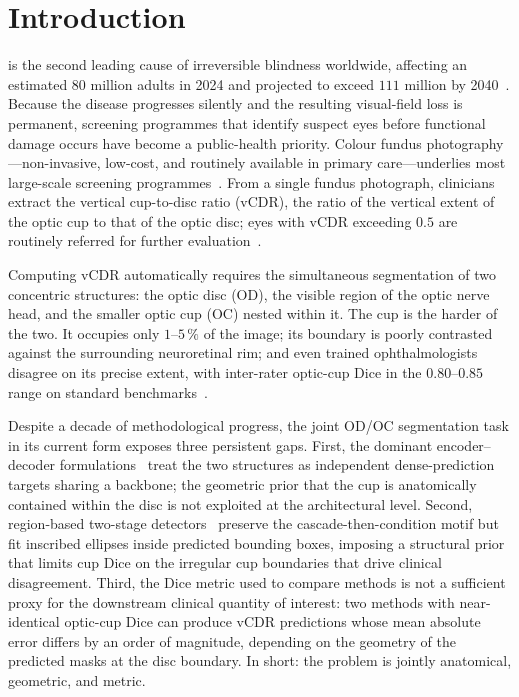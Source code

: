 \documentclass[10pt,journal,twocolumn]{IEEEtran}
\begin{document}
\section{Introduction}

 is the second leading cause of irreversible blindness worldwide, affecting an estimated $80$ million adults in 2024 and projected to exceed $111$ million by 2040~\cite{li2023rdcnn}. Because the disease progresses silently and the resulting visual-field loss is permanent, screening programmes that identify suspect eyes before functional damage occurs have become a public-health priority. Colour fundus photography---non-invasive, low-cost, and routinely available in primary care---underlies most large-scale screening programmes~\cite{retfound2023nature}. From a single fundus photograph, clinicians extract the vertical cup-to-disc ratio (vCDR), the ratio of the vertical extent of the optic cup to that of the optic disc; eyes with vCDR exceeding $0.5$ are routinely referred for further evaluation~\cite{li2023rdcnn,sivaswamy2014drishti}.

Computing vCDR automatically requires the simultaneous segmentation of two concentric structures: the optic disc (OD), the visible region of the optic nerve head, and the smaller optic cup (OC) nested within it. The cup is the harder of the two. It occupies only $1$--$5\,\%$ of the image; its boundary is poorly contrasted against the surrounding neuroretinal rim; and even trained ophthalmologists disagree on its precise extent, with inter-rater optic-cup Dice in the $0.80$--$0.85$ range on standard benchmarks~\cite{sivaswamy2014drishti}.

Despite a decade of methodological progress, the joint OD/OC segmentation task in its current form exposes three persistent gaps. First, the dominant encoder--decoder formulations~\cite{chen2021transunet,cao2021swinunet,mrsnet2023,rfaucnxt2023,edcoatunet2025} treat the two structures as independent dense-prediction targets sharing a backbone; the geometric prior that the cup is anatomically contained within the disc is not exploited at the architectural level. Second, region-based two-stage detectors~\cite{li2023rdcnn} preserve the cascade-then-condition motif but fit inscribed ellipses inside predicted bounding boxes, imposing a structural prior that limits cup Dice on the irregular cup boundaries that drive clinical disagreement. Third, the Dice metric used to compare methods is not a sufficient proxy for the downstream clinical quantity of interest: two methods with near-identical optic-cup Dice can produce vCDR predictions whose mean absolute error differs by an order of magnitude, depending on the geometry of the predicted masks at the disc boundary. In short: the problem is jointly anatomical, geometric, and metric.
\end{document}
